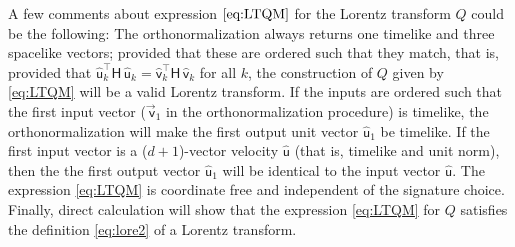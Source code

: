 \documentclass{article}
\newcommand{\metric}{\mathsf{H}}
\newcommand\upvec[1]{\!\vec{\,\mathrm{#1}}}
\newcommand{\Lvec}[1]{\upvec{\mathsf{#1}}} %
\newcommand{\Lhat}[1]{\hat{\mathsf{#1}}} %
\newcommand{\plus}{\!+\!} %
\begin{document}
A few comments about expression $\eqref{eq:LTQM}$ for the Lorentz transform $Q$ could be the following:
The orthonormalization always returns one timelike and three spacelike vectors;
provided that these are ordered such that they match, that is, provided that $\Lhat{u}_k^\top\metric\,\Lhat{u}_k=\Lhat{v}_k^\top\metric\,\Lhat{v}_k$ for all $k$, the construction of $Q$ given by \eqref{eq:LTQM} will be a valid Lorentz transform.
If the inputs are ordered such that the first input vector ($\Lvec{v}_1$ in the orthonormalization procedure) is timelike, the orthonormalization will make the first output unit vector $\Lhat{u}_1$ be timelike.
If the first input vector is a ($d\plus1$)-vector velocity $\Lhat{u}$ (that is, timelike and unit norm), then the the first output vector $\Lhat{u}_1$ will be identical to the input vector $\Lhat{u}$.
The expression \eqref{eq:LTQM} is coordinate free and independent of the signature choice.
Finally, direct calculation will show that the expression \eqref{eq:LTQM} for $Q$ satisfies the definition \eqref{eq:lore2} of a Lorentz transform.
\end{document}

